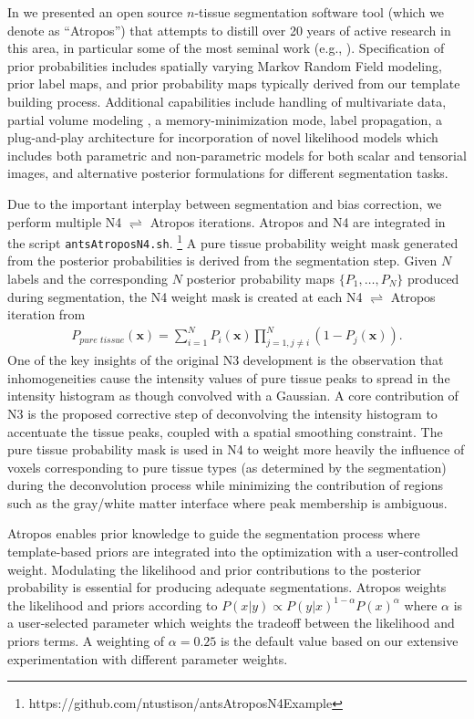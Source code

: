 In \cite{avants2011a} we presented an open source $n$-tissue segmentation software tool
(which we denote as ``Atropos'') that attempts to distill over 20 years of active research in this area,
in particular some of the most seminal work (e.g., \cite{zhang2001,ashburner2005}).
Specification of prior probabilities includes spatially varying Markov Random Field modeling, 
prior label maps, and prior probability maps typically derived from our template building 
process.  Additional
capabilities include handling of multivariate data, 
partial volume modeling \citep{shattuck2001}, a memory-minimization mode,
label propagation, a plug-and-play architecture for incorporation of novel likelihood models
which includes both parametric and non-parametric models for both scalar and tensorial
images, and alternative posterior formulations for different segmentation tasks.

Due to the important interplay between segmentation and bias correction,
we perform multiple N4 $\rightleftharpoons$ Atropos iterations.
Atropos and N4 are integrated in the script {\tt antsAtroposN4.sh}.%
\footnote{
https://github.com/ntustison/antsAtroposN4Example
}
A pure tissue probability weight mask generated from the 
posterior probabilities is derived from the segmentation 
step.  Given $N$ labels and the corresponding $N$
posterior probability maps $\{ P_1, \ldots, P_N\}$ produced
during segmentation, the N4 weight mask is 
created at each N4 $\rightleftharpoons$ Atropos iteration from
\begin{align}
  P_{pure\,\,tissue}(\mathbf{x}) = \sum_{i=1}^N P_i(\mathbf{x}) \prod_{j=1, j \neq i}^N \left( 1 - P_j(\mathbf{x}) \right).
\end{align}
One of the key insights of the original N3 development is the
observation that inhomogeneities cause the intensity values of
pure tissue peaks to spread in the intensity histogram as though
convolved with a Gaussian.  A core contribution of N3 is the
proposed corrective step of deconvolving the intensity histogram to
accentuate the tissue peaks, coupled with a spatial smoothing
constraint. The pure tissue probability mask is used in N4 to weight
more heavily the influence of voxels corresponding to pure tissue 
types (as determined by the segmentation) during the deconvolution process 
while minimizing the contribution of regions such as the gray/white matter 
interface where peak membership is ambiguous. 

Atropos enables prior knowledge to guide the
segmentation process where template-based priors are integrated into the optimization
with a user-controlled weight.  Modulating the likelihood and prior contributions
to the posterior probability is essential for producing adequate segmentations.
Atropos weights the likelihood and priors according to
$P(x|y) \propto P(y|x)^{1-\alpha}P(x)^{\alpha}$
where $\alpha$ is a user-selected parameter which weights the tradeoff between the likelihood and priors terms.  A weighting of $\alpha = 0.25$ is the default value based 
on our extensive experimentation with different parameter weights.


